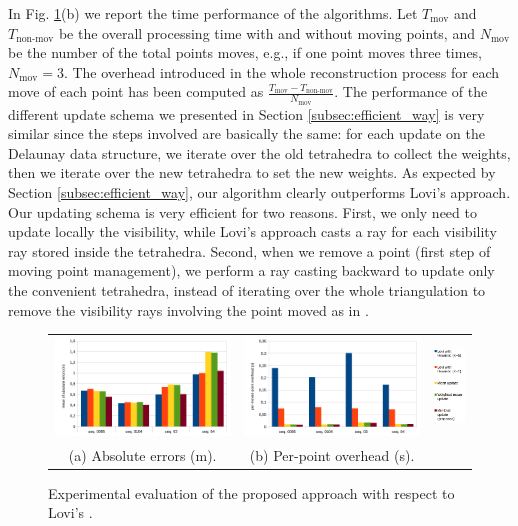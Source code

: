 In Fig. \ref{tab:results}(b) we report the time performance of the algorithms.
Let $T_{\text{mov}}$ and $T_{\text{non-mov}}$ be the overall processing time with and without moving points, and $N_{\text{mov}}$ be the number of the total points moves, e.g., if one point moves three times, $N_{\text{mov}}=3$.
The overhead introduced in the whole reconstruction process for each move of each point has been computed as $\frac{T_{\text{mov}} - T_{\text{non-mov}}}{N_{\text{mov}}}$.
The performance of the different update schema we presented in Section \ref{subsec:efficient_way} is very similar since the steps involved are basically the same: for each update on the Delaunay data structure, we iterate over the old tetrahedra to collect the weights, then we iterate over the new tetrahedra to set the new weights.
As expected by Section \ref{subsec:efficient_way}, our algorithm clearly outperforms Lovi's approach. Our updating schema is very efficient for two reasons. 
First, we only need to update locally the visibility, while Lovi's approach casts a ray for each visibility ray stored inside the tetrahedra.
Second, when we remove a point (first step of moving point management), we perform a ray casting backward to update only the convenient tetrahedra,  instead of iterating over the whole triangulation to remove the visibility rays involving the point moved as in \cite{lovi_et_al_11}.
  
 
\begin{figure}[t]
\centering
  \begin{tabular}{ccc}
    \centering
    \includegraphics[height=0.25\textwidth]{././img//results.pdf}&
    \includegraphics[height=0.25\textwidth]{././img//resultsTiming.pdf}&
    \includegraphics[height=0.22\textwidth]{././img//legenda}\\
    (a) Absolute errors (m).&
    (b) Per-point overhead (s).&\\
  \end{tabular}
  \caption{Experimental evaluation of the proposed approach with respect to Lovi's \cite{lovi_et_al_11}.}
   \label{tab:results}
\end{figure}


